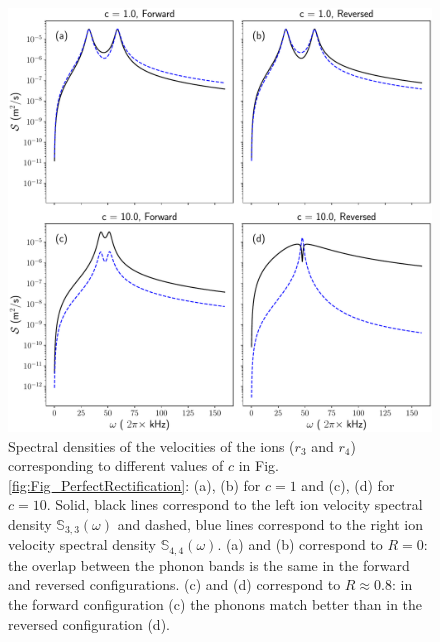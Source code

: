 \begin{figure}[t]
  \includegraphics[width=\linewidth]{Figures/SpectrumComparative.pdf}
  \caption{Spectral densities of the velocities of the ions ($r_3$ and $r_4$) corresponding to different values of $c$ in Fig. \ref{fig:Fig_PerfectRectification}: (a), (b) for $c=1$ and (c), (d) for $c=10$. Solid, black lines correspond to the left ion velocity spectral density $\mathbb{S}_{3,3}(\omega)$ and dashed, blue lines correspond to the right ion velocity spectral density $\mathbb{S}_{4,4}(\omega)$. (a) and (b) correspond to $R = 0$:  the overlap between the phonon bands is the same in the forward and reversed configurations. (c) and (d) correspond to $R\approx 0.8$:  in the forward configuration (c)  the phonons match better than in the reversed configuration (d).}
  \label{fig:Figure_Spectra}
\end{figure}


